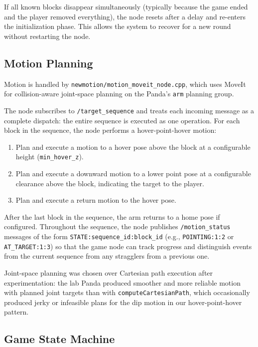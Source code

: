 \documentclass[conference]{IEEEtran}
\begin{document}
If all known blocks disappear simultaneously (typically because the
game ended and the player removed everything), the node resets after
a delay and re-enters the initialization phase. This allows the system
to recover for a new round without restarting the node.

\subsection{Motion Planning}
\label{sec:motion}

Motion is handled by \texttt{newmotion/motion\_moveit\_node.cpp}, which
uses MoveIt for collision-aware joint-space planning on the Panda's
\texttt{arm} planning group.

The node subscribes to \texttt{/target\_sequence} and treats each
incoming message as a complete dispatch: the entire sequence is
executed as one operation. For each block in the sequence, the node
performs a hover-point-hover motion:

\begin{enumerate}
\item Plan and execute a motion to a hover pose above the block at
a configurable height (\texttt{min\_hover\_z}).
\item Plan and execute a downward motion to a lower point pose at
a configurable clearance above the block, indicating the target to
the player.
\item Plan and execute a return motion to the hover pose.
\end{enumerate}

After the last block in the sequence, the arm returns to a home pose
if configured. Throughout the sequence, the node publishes
\texttt{/motion\_status} messages of the form
\texttt{STATE:sequence\_id:block\_id} (e.g.,
\texttt{POINTING:1:2} or \texttt{AT\_TARGET:1:3}) so that the game
node can track progress and distinguish events from the current
sequence from any stragglers from a previous one.

Joint-space planning was chosen over Cartesian path execution after
experimentation: the lab Panda produced smoother and more reliable
motion with planned joint targets than with
\texttt{computeCartesianPath}, which occasionally produced jerky or
infeasible plans for the dip motion in our hover-point-hover pattern.

\subsection{Game State Machine}
\label{sec:game_state}
\end{document}

